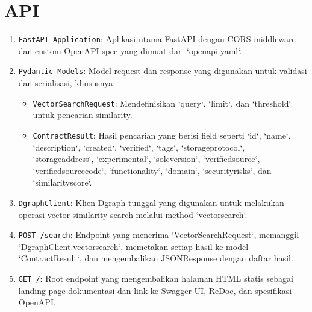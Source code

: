 \chapter{API}
\label{appendix:api}

\begin{enumerate}
	\item \texttt{FastAPI Application}: Aplikasi utama FastAPI dengan CORS middleware dan custom OpenAPI spec yang dimuat dari `openapi.yaml`.
	\item \texttt{Pydantic Models}: Model request dan response yang digunakan untuk validasi dan serialisasi, khususnya:
	      \begin{itemize}
		      \item \texttt{VectorSearchRequest}: Mendefinisikan `query`, `limit`, dan `threshold` untuk pencarian similarity.
		      \item \texttt{ContractResult}: Hasil pencarian yang berisi field seperti `id`, `name`, `description`, `created`, `verified`, `tags`, `storage\textunderscore protocol`, `storage\textunderscore address`, `experimental`, `solc\textunderscore version`, `verified\textunderscore source`, `verified\textunderscore source\textunderscore code`, `functionality`, `domain`, `security\textunderscore risks`, dan `similarity\textunderscore score`.
	      \end{itemize}
	\item \texttt{DgraphClient}: Klien Dgraph tunggal yang digunakan untuk melakukan operasi vector similarity search melalui method `vector\textunderscore search`.
	\item \texttt{POST /search}: Endpoint yang menerima `VectorSearchRequest`, memanggil `DgraphClient.vector\textunderscore search`, memetakan setiap hasil ke model `ContractResult`, dan mengembalikan JSONResponse dengan daftar hasil.
	\item \texttt{GET /}: Root endpoint yang mengembalikan halaman HTML statis sebagai landing page dokumentasi dan link ke Swagger UI, ReDoc, dan spesifikasi OpenAPI.
\end{enumerate}



